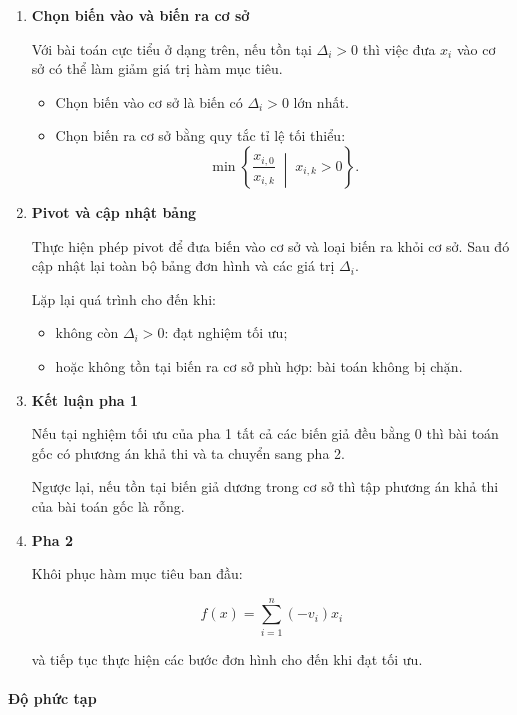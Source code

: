 \documentclass[fontsize=13pt,a4paper]{report}
\begin{document}
\begin{enumerate}
    do:

    \[
    \Delta_i=0-(-v_i)=v_i.
    \]

    \item \textbf{Chọn biến vào và biến ra cơ sở}

    Với bài toán cực tiểu ở dạng trên, nếu tồn tại
    \(\Delta_i>0\) thì việc đưa \(x_i\) vào cơ sở có thể làm giảm giá trị hàm mục tiêu.

    \begin{itemize}
        \item Chọn biến vào cơ sở là biến có \(\Delta_i>0\) lớn nhất.
        \item Chọn biến ra cơ sở bằng quy tắc tỉ lệ tối thiểu:
    \[
    \min \left\{
    \frac{x_{i,0}}{x_{i,k}}
    \;\middle|\;
    x_{i,k}>0
    \right\}.
    \]
    \end{itemize}

    \item \textbf{Pivot và cập nhật bảng}

    Thực hiện phép pivot để đưa biến vào cơ sở và loại biến ra khỏi cơ sở. Sau đó cập nhật lại toàn bộ bảng đơn hình và các giá trị \(\Delta_i\).

    Lặp lại quá trình cho đến khi:

    \begin{itemize}
        \item không còn \(\Delta_i>0\): đạt nghiệm tối ưu;
        \item hoặc không tồn tại biến ra cơ sở phù hợp: bài toán không bị chặn.
    \end{itemize}

    \item \textbf{Kết luận pha 1}

    Nếu tại nghiệm tối ưu của pha 1 tất cả các biến giả đều bằng \(0\) thì bài toán gốc có phương án khả thi và ta chuyển sang pha 2.

    Ngược lại, nếu tồn tại biến giả dương trong cơ sở thì tập phương án khả thi của bài toán gốc là rỗng.

    \item \textbf{Pha 2}

    Khôi phục hàm mục tiêu ban đầu:

    \[
    f(x)=\sum_{i=1}^{n} (-v_i)x_i
    \]

    và tiếp tục thực hiện các bước đơn hình cho đến khi đạt tối ưu.

\end{enumerate}

\paragraph{Độ phức tạp}
\end{document}
